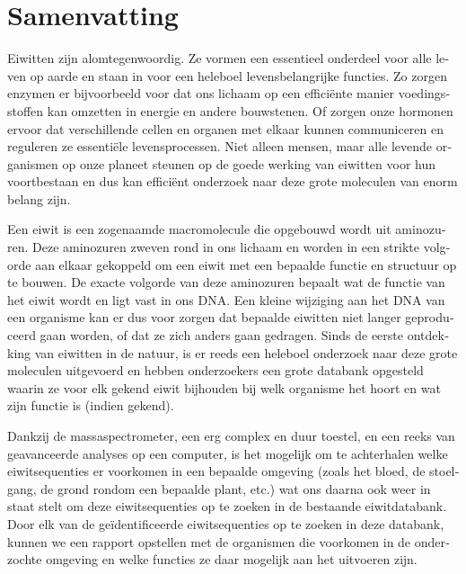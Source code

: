 \chapter*{Samenvatting}

\begin{otherlanguage}{dutch}
Eiwitten zijn alomtegenwoordig.
Ze vormen een essentieel onderdeel voor alle leven op aarde en staan in voor een heleboel levensbelangrijke functies.
Zo zorgen enzymen er bijvoorbeeld voor dat ons lichaam op een efficiënte manier voedingsstoffen kan omzetten in energie en andere bouwstenen.
Of zorgen onze hormonen ervoor dat verschillende cellen en organen met elkaar kunnen communiceren en reguleren ze essentiële levensprocessen.
Niet alleen mensen, maar alle levende organismen op onze planeet steunen op de goede werking van eiwitten voor hun voortbestaan en dus kan efficiënt onderzoek naar deze grote moleculen van enorm belang zijn.

Een eiwit is een zogenaamde macromolecule die opgebouwd wordt uit aminozuren.
Deze aminozuren zweven rond in ons lichaam en worden in een strikte volgorde aan elkaar gekoppeld om een eiwit met een bepaalde functie en structuur op te bouwen.
De exacte volgorde van deze aminozuren bepaalt wat de functie van het eiwit wordt en ligt vast in ons DNA.
Een kleine wijziging aan het DNA van een organisme kan er dus voor zorgen dat bepaalde eiwitten niet langer geproduceerd gaan worden, of dat ze zich anders gaan gedragen.
Sinds de eerste ontdekking van eiwitten in de natuur, is er reeds een heleboel onderzoek naar deze grote moleculen uitgevoerd en hebben onderzoekers een grote databank opgesteld waarin ze voor elk gekend eiwit bijhouden bij welk organisme het hoort en wat zijn functie is (indien gekend).

Dankzij de massaspectrometer, een erg complex en duur toestel, en een reeks van geavanceerde analyses op een computer, is het mogelijk om te achterhalen welke eiwitsequenties er voorkomen in een bepaalde omgeving (zoals het bloed, de stoelgang, de grond rondom een bepaalde plant, etc.) wat ons daarna ook weer in staat stelt om deze eiwitsequenties op te zoeken in de bestaande eiwitdatabank.
Door elk van de geïdentificeerde eiwitsequenties op te zoeken in deze databank, kunnen we een rapport opstellen met de organismen die voorkomen in de onderzochte omgeving en welke functies ze daar mogelijk aan het uitvoeren zijn.


\end{otherlanguage}
